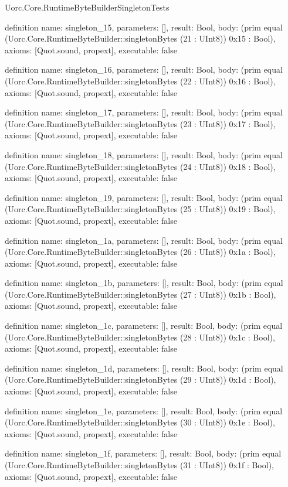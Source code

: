 \begin{lexlean}{Uorc.Core.RuntimeByteBuilderSingletonTests}
\begin{semanticmodule}
definition{
  name: singleton_15,
  parameters: [],
  result: Bool,
  body: (prim equal (Uorc.Core.RuntimeByteBuilder::singletonBytes (21 : UInt8)) 0x15 : Bool),
  axioms: [Quot.sound, propext],
  executable: false
}

definition{
  name: singleton_16,
  parameters: [],
  result: Bool,
  body: (prim equal (Uorc.Core.RuntimeByteBuilder::singletonBytes (22 : UInt8)) 0x16 : Bool),
  axioms: [Quot.sound, propext],
  executable: false
}

definition{
  name: singleton_17,
  parameters: [],
  result: Bool,
  body: (prim equal (Uorc.Core.RuntimeByteBuilder::singletonBytes (23 : UInt8)) 0x17 : Bool),
  axioms: [Quot.sound, propext],
  executable: false
}

definition{
  name: singleton_18,
  parameters: [],
  result: Bool,
  body: (prim equal (Uorc.Core.RuntimeByteBuilder::singletonBytes (24 : UInt8)) 0x18 : Bool),
  axioms: [Quot.sound, propext],
  executable: false
}

definition{
  name: singleton_19,
  parameters: [],
  result: Bool,
  body: (prim equal (Uorc.Core.RuntimeByteBuilder::singletonBytes (25 : UInt8)) 0x19 : Bool),
  axioms: [Quot.sound, propext],
  executable: false
}

definition{
  name: singleton_1a,
  parameters: [],
  result: Bool,
  body: (prim equal (Uorc.Core.RuntimeByteBuilder::singletonBytes (26 : UInt8)) 0x1a : Bool),
  axioms: [Quot.sound, propext],
  executable: false
}

definition{
  name: singleton_1b,
  parameters: [],
  result: Bool,
  body: (prim equal (Uorc.Core.RuntimeByteBuilder::singletonBytes (27 : UInt8)) 0x1b : Bool),
  axioms: [Quot.sound, propext],
  executable: false
}

definition{
  name: singleton_1c,
  parameters: [],
  result: Bool,
  body: (prim equal (Uorc.Core.RuntimeByteBuilder::singletonBytes (28 : UInt8)) 0x1c : Bool),
  axioms: [Quot.sound, propext],
  executable: false
}

definition{
  name: singleton_1d,
  parameters: [],
  result: Bool,
  body: (prim equal (Uorc.Core.RuntimeByteBuilder::singletonBytes (29 : UInt8)) 0x1d : Bool),
  axioms: [Quot.sound, propext],
  executable: false
}

definition{
  name: singleton_1e,
  parameters: [],
  result: Bool,
  body: (prim equal (Uorc.Core.RuntimeByteBuilder::singletonBytes (30 : UInt8)) 0x1e : Bool),
  axioms: [Quot.sound, propext],
  executable: false
}

definition{
  name: singleton_1f,
  parameters: [],
  result: Bool,
  body: (prim equal (Uorc.Core.RuntimeByteBuilder::singletonBytes (31 : UInt8)) 0x1f : Bool),
  axioms: [Quot.sound, propext],
  executable: false
}


\end{semanticmodule}
\end{lexlean}
